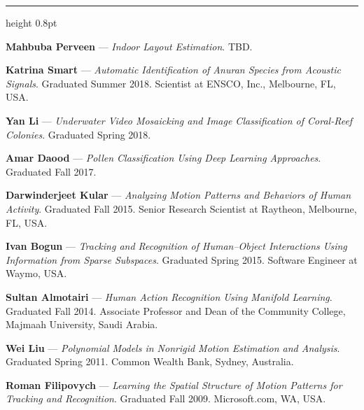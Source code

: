 \documentclass[11pt]{article}
\newcommand{\cvsection}[1]{%
  \vspace{12pt}%
  {\normalfont\large\scshape\textls[120]{#1}}\par
  \vspace{2pt}\hrule height 0.8pt\vspace{7pt}}
\newcommand{\cvsubsection}[1]{%
  \vspace{6pt}{\normalfont\scshape #1}\par\vspace{3pt}}
\begin{document}
\cvsection{Student Supervision}
\cvsubsection{Current Ph.D. Students}
\begin{cvitems}
  \item \textbf{Mahbuba Perveen} --- \textit{Indoor Layout Estimation}. TBD.
\end{cvitems}
\vspace{4pt}
\cvsubsection{Graduated Ph.D. Students}
\begin{cvitems}
  \item \textbf{Katrina Smart} --- \textit{Automatic Identification of Anuran Species from Acoustic Signals}. Graduated Summer 2018. Scientist at ENSCO, Inc., Melbourne, FL, USA.
  \item \textbf{Yan Li} --- \textit{Underwater Video Mosaicking and Image Classification of Coral-Reef Colonies}. Graduated Spring 2018.
  \item \textbf{Amar Daood} --- \textit{Pollen Classification Using Deep Learning Approaches}. Graduated Fall 2017.
  \item \textbf{Darwinderjeet Kular} --- \textit{Analyzing Motion Patterns and Behaviors of Human Activity}. Graduated Fall 2015. Senior Research Scientist at Raytheon, Melbourne, FL, USA.
  \item \textbf{Ivan Bogun} --- \textit{Tracking and Recognition of Human--Object Interactions Using Information from Sparse Subspaces}. Graduated Spring 2015. Software Engineer at Waymo, USA.
  \item \textbf{Sultan Almotairi} --- \textit{Human Action Recognition Using Manifold Learning}. Graduated Fall 2014. Associate Professor and Dean of the Community College, Majmaah University, Saudi Arabia.
  \item \textbf{Wei Liu} --- \textit{Polynomial Models in Nonrigid Motion Estimation and Analysis}. Graduated Spring 2011. Common Wealth Bank, Sydney, Australia.
  \item \textbf{Roman Filipovych} --- \textit{Learning the Spatial Structure of Motion Patterns for Tracking and Recognition}. Graduated Fall 2009. Microsoft.com, WA, USA.
\end{cvitems}
\vspace{4pt}
\newpage
\cvsubsection{Graduated M.Sc.\ (Thesis) Students}
\end{document}
